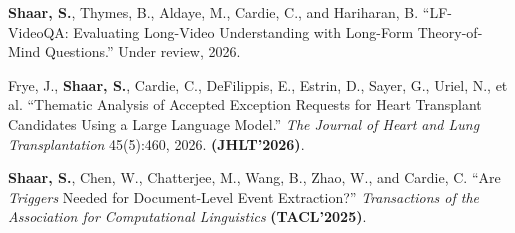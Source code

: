 
\begin{publist}
  \item \textbf{Shaar, S.}, Thymes, B., Aldaye, M., Cardie, C., and Hariharan, B. ``LF-VideoQA: Evaluating Long-Video Understanding with Long-Form Theory-of-Mind Questions.'' Under review, 2026.
\end{publist}

\begin{publist}
  \item Frye, J., \textbf{Shaar, S.}, Cardie, C., DeFilippis, E., Estrin, D., Sayer, G., Uriel, N., et al. ``Thematic Analysis of Accepted Exception Requests for Heart Transplant Candidates Using a Large Language Model.'' \textit{The Journal of Heart and Lung Transplantation} 45(5):460, 2026. \textbf{(JHLT'2026)}.

  \item \textbf{Shaar, S.}, Chen, W., Chatterjee, M., Wang, B., Zhao, W., and Cardie, C. ``Are \textit{Triggers} Needed for Document-Level Event Extraction?'' \textit{Transactions of the Association for Computational Linguistics} \textbf{(TACL'2025)}.
\end{publist}

